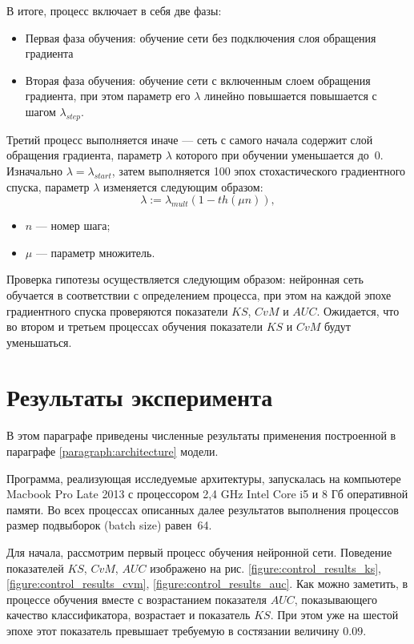 \documentclass[14pt, a4paper]{extarticle}
\begin{document}
В итоге, процесс включает в себя две фазы:
\begin{itemize}
	\item Первая фаза обучения: обучение сети без подключения слоя обращения градиента
	\item Вторая фаза обучения: обучение сети с включенным слоем обращения градиента, при этом параметр его $\lambda$ линейно повышается повышается с шагом $\lambda_{step}$.
\end{itemize}

Третий процесс выполняется иначе — сеть с самого начала содержит слой обращения градиента, параметр $\lambda$ которого при обучении уменьшается до~$0$. Изначально $\lambda=\lambda_{start}$, затем выполняется 100 эпох стохастического градиентного спуска, параметр $\lambda$ изменяется следующим образом: 
\begin{equation*}
	\lambda := \lambda_{mult}(1 - th(\mu n)),
\end{equation*}
\begin{itemize}
	\item $n$ — номер шага;
	\item $\mu$ — параметр множитель.
\end{itemize}

Проверка гипотезы осуществляется следующим образом: нейронная сеть обучается в соответствии с определением процесса, при этом на каждой эпохе градиентного спуска проверяются показатели $KS$, $CvM$ и $AUC$. Ожидается, что во втором и третьем процессах обучения показатели $KS$ и $CvM$ будут уменьшаться.

\section{Результаты эксперимента}
\label{paragraph:results}

В этом параграфе приведены численные результаты применения построенной в параграфе \ref{paragraph:architecture} модели.

Программа, реализующая исследуемые архитектуры, запускалась на компьютере Macbook Pro Late 2013 с процессором 2,4 GHz Intel Core i5 и 8 Гб оперативной памяти. Во всех процессах описанных далее результатов выполнения процессов размер подвыборок (batch size) равен~64.

Для начала, рассмотрим первый процесс обучения нейронной сети. Поведение показателей $KS$, $CvM$, $AUC$ изображено на рис. \ref{figure:control_results_ks}, \ref{figure:control_results_cvm}, \ref{figure:control_results_auc}. Как можно заметить, в процессе обучения вместе с возрастанием показателя $AUC$, показывающего качество классификатора, возрастает и показатель $KS$. При этом уже на шестой эпохе этот показатель превышает требуемую в состязании величину $0.09$. 
\end{document}
